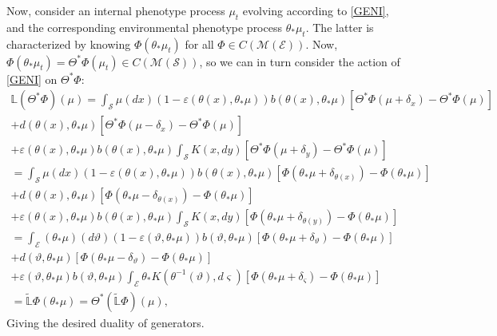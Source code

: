 \documentclass[11pt]{amsart}
\theoremstyle{remark}
\theoremstyle{definition}
\begin{document}
Now, consider an internal phenotype process $\mu_{t}$ evolving according to \eqref{GENI}, and the corresponding environmental phenotype process $\theta_{*}\mu_{t}$.  The latter is characterized by knowing $\Phi(\theta_{*}\mu_{t})$ for all $\Phi \in C(\mathcal{M}(\mathcal{E}))$.  Now, $\Phi(\theta_{*}\mu_{t}) = \Theta^{*}\Phi(\mu_{t}) \in C(\mathcal{M}(\mathcal{S}))$, so we can in turn consider the action of \eqref{GENI} on $\Theta^{*}\Phi$:
\begin{multline*}
	\mathbb{L}(\Theta^{*}\Phi)(\mu) 
	= \int_{\mathcal{S}} \mu(dx) (1-\varepsilon(\theta(x),\theta_{*}\mu)) b(\theta(x),\theta_{*}\mu)
		[\Theta^{*}\Phi(\mu+\delta_{x})-\Theta^{*}\Phi(\mu)]\\
	+ d(\theta(x),\theta_{*}\mu)[\Theta^{*}\Phi(\mu-\delta_{x})-\Theta^{*}\Phi(\mu)]\\
	+ \varepsilon(\theta(x),\theta_{*}\mu) b(\theta(x),\theta_{*}\mu)
		\int_{\mathcal{S}} K(x,dy)[\Theta^{*}\Phi(\mu+\delta_{y})-\Theta^{*}\Phi(\mu)]\\
	= \int_{\mathcal{S}} \mu(dx) (1-\varepsilon(\theta(x),\theta_{*}\mu)) b(\theta(x),\theta_{*}\mu)
		[\Phi(\theta_{*}\mu+\delta_{\theta(x)})-\Phi(\theta_{*}\mu)]\\
	+ d(\theta(x),\theta_{*}\mu)[\Phi(\theta_{*}\mu-\delta_{\theta(x)})-\Phi(\theta_{*}\mu)]\\
	+ \varepsilon(\theta(x),\theta_{*}\mu) b(\theta(x),\theta_{*}\mu)
		\int_{\mathcal{S}} K(x,dy)[\Phi(\theta_{*}\mu+\delta_{\theta(y)})-\Phi(\theta_{*}\mu)]\\
	= \int_{\mathcal{E}} (\theta_{*}\mu)(d\vartheta) (1-\varepsilon(\vartheta,\theta_{*}\mu)) b(\vartheta,\theta_{*}\mu)
		[\Phi(\theta_{*}\mu+\delta_{\vartheta})-\Phi(\theta_{*}\mu)]\\
	+ d(\vartheta,\theta_{*}\mu)[\Phi(\theta_{*}\mu-\delta_{\vartheta})-\Phi(\theta_{*}\mu)]\\
	+ \varepsilon(\vartheta,\theta_{*}\mu) b(\vartheta,\theta_{*}\mu)
		\int_{\mathcal{E}} \theta_{*}K(\theta^{-1}(\vartheta),d\varsigma)[\Phi(\theta_{*}\mu+\delta_{\varsigma})-\Phi(\theta_{*}\mu)]\\
	= \tilde{\mathbb{L}}\Phi(\theta_{*}\mu)
	= \Theta^{*}(\tilde{\mathbb{L}}\Phi)(\mu),
\end{multline*}
Giving the desired duality of generators.
\end{document}
